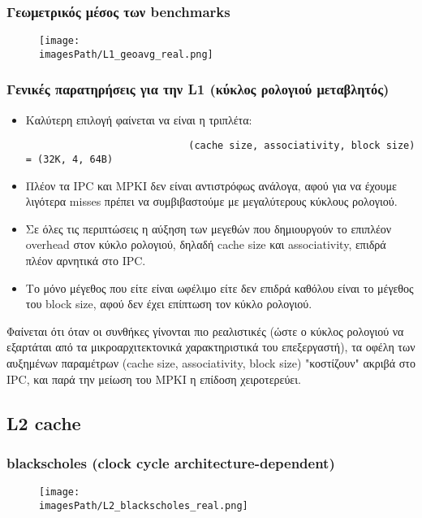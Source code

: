 \documentclass[12pt,a4paper]{article}
\newcommand{\imagesPath}{parsec-3.0/parsec_workspace/graphs}
\begin{document}
			\subsubsection{Γεωμετρικός μέσος των benchmarks}
				\begin{figure}[H]
					\begin{center}
						\texttt{[image: \\imagesPath/L1\_geoavg\_real.png]}
					\end{center}
			\end{figure}
				
			\subsubsection{Γενικές παρατηρήσεις για την L1 (κύκλος ρολογιού μεταβλητός)}
				\begin{itemize}
					\item Καλύτερη επιλογή φαίνεται να είναι η τριπλέτα:
						
						\begin{verbatim}
							(cache size, associativity, block size) = (32K, 4, 64B)
						\end{verbatim}
					
					\item Πλέον τα IPC και MPKI δεν είναι αντιστρόφως ανάλογα, αφού για να έχουμε λιγότερα misses πρέπει να συμβιβαστούμε με μεγαλύτερους κύκλους ρολογιού.
					\item Σε όλες τις περιπτώσεις η αύξηση των μεγεθών που δημιουργούν το επιπλέον overhead στον κύκλο ρολογιού, δηλαδή cache size και associativity, επιδρά πλέον αρνητικά στο IPC. 
					\item Το μόνο μέγεθος που είτε είναι ωφέλιμο είτε δεν επιδρά καθόλου είναι το μέγεθος του block size, αφού δεν έχει επίπτωση τον κύκλο ρολογιού.
				\end{itemize}
			
				Φαίνεται ότι όταν οι συνθήκες γίνονται πιο ρεαλιστικές (ώστε ο κύκλος ρολογιού να εξαρτάται από τα μικροαρχιτεκτονικά χαρακτηριστικά του επεξεργαστή), τα οφέλη των αυξημένων παραμέτρων (cache size, associativity, block size) "κοστίζουν" ακριβά στο IPC, και παρά την μείωση του MPKI η επίδοση χειροτερεύει.
		
		\subsection{L2 cache}
			
			\subsubsection{blackscholes (clock cycle architecture-dependent)}
				\begin{figure}[H]
					\begin{center}
						\texttt{[image: \\imagesPath/L2\_blackscholes\_real.png]}
					\end{center}
				\end{figure}
						
\end{document}

